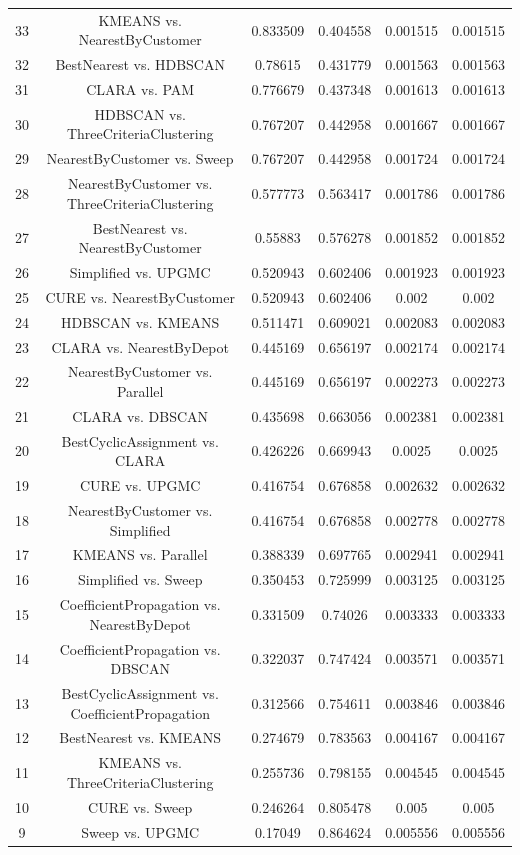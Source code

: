 \documentclass[a4paper,10pt]{article}
\begin{document}
\begin{landscape}
\begin{table}[!htp]
\begin{tabular}{cccccc}
33&KMEANS vs. NearestByCustomer&0.833509&0.404558&0.001515&0.001515\\
32&BestNearest vs. HDBSCAN&0.78615&0.431779&0.001563&0.001563\\
31&CLARA vs. PAM&0.776679&0.437348&0.001613&0.001613\\
30&HDBSCAN vs. ThreeCriteriaClustering&0.767207&0.442958&0.001667&0.001667\\
29&NearestByCustomer vs. Sweep&0.767207&0.442958&0.001724&0.001724\\
28&NearestByCustomer vs. ThreeCriteriaClustering&0.577773&0.563417&0.001786&0.001786\\
27&BestNearest vs. NearestByCustomer&0.55883&0.576278&0.001852&0.001852\\
26&Simplified vs. UPGMC&0.520943&0.602406&0.001923&0.001923\\
25&CURE vs. NearestByCustomer&0.520943&0.602406&0.002&0.002\\
24&HDBSCAN vs. KMEANS&0.511471&0.609021&0.002083&0.002083\\
23&CLARA vs. NearestByDepot&0.445169&0.656197&0.002174&0.002174\\
22&NearestByCustomer vs. Parallel&0.445169&0.656197&0.002273&0.002273\\
21&CLARA vs. DBSCAN&0.435698&0.663056&0.002381&0.002381\\
20&BestCyclicAssignment vs. CLARA&0.426226&0.669943&0.0025&0.0025\\
19&CURE vs. UPGMC&0.416754&0.676858&0.002632&0.002632\\
18&NearestByCustomer vs. Simplified&0.416754&0.676858&0.002778&0.002778\\
17&KMEANS vs. Parallel&0.388339&0.697765&0.002941&0.002941\\
16&Simplified vs. Sweep&0.350453&0.725999&0.003125&0.003125\\
15&CoefficientPropagation vs. NearestByDepot&0.331509&0.74026&0.003333&0.003333\\
14&CoefficientPropagation vs. DBSCAN&0.322037&0.747424&0.003571&0.003571\\
13&BestCyclicAssignment vs. CoefficientPropagation&0.312566&0.754611&0.003846&0.003846\\
12&BestNearest vs. KMEANS&0.274679&0.783563&0.004167&0.004167\\
11&KMEANS vs. ThreeCriteriaClustering&0.255736&0.798155&0.004545&0.004545\\
10&CURE vs. Sweep&0.246264&0.805478&0.005&0.005\\
9&Sweep vs. UPGMC&0.17049&0.864624&0.005556&0.005556\\

\end{tabular}
\end{table}
\end{landscape}
\end{document}
